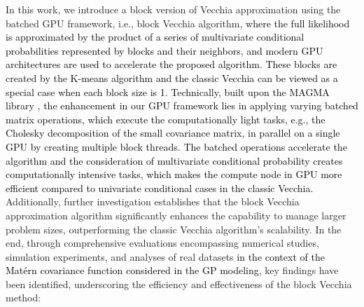 \documentclass[12pt]{article}
\begin{document}
In this work, we introduce a block version of Vecchia approximation using the batched GPU framework, i.e., block Vecchia algorithm, 
\textcolor{black}{
where the full likelihood is approximated by the product of a series of multivariate conditional probabilities represented by blocks and their neighbors, and modern GPU architectures are used to accelerate the proposed algorithm. 
These blocks are created by the K-means algorithm and the classic Vecchia can be viewed as a special case when each block size is 1.
Technically, built upon the MAGMA library \citep{dong2016magma}, the enhancement in our GPU framework lies in applying varying batched matrix operations, which execute the computationally light tasks, e.g., the Cholesky decomposition of the small covariance matrix, in parallel on a single GPU by creating multiple block threads. The batched operations accelerate the algorithm and the consideration of multivariate conditional probability creates computationally intensive tasks, which makes the compute node in GPU more efficient compared to univariate conditional cases in the classic Vecchia.}  
Additionally, further investigation establishes that the block Vecchia approximation algorithm significantly enhances the capability to manage larger problem sizes, outperforming the classic Vecchia algorithm's scalability. In the end, through comprehensive evaluations encompassing numerical studies, simulation experiments, and analyses of real datasets \textcolor{black}{in the context of the Mat\'ern covariance function considered in the GP modeling}, key findings have been identified, underscoring the efficiency and effectiveness of the block Vecchia method:
\end{document}
